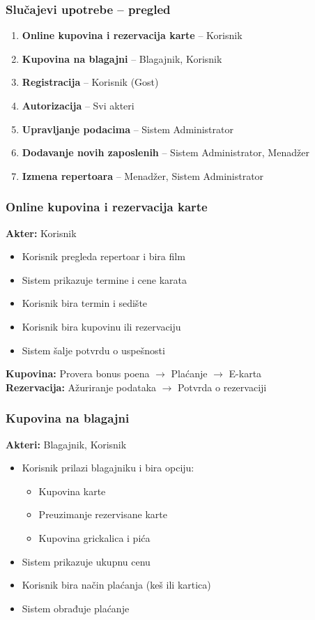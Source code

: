 \documentclass{beamer}
\begin{document}
\begin{frame}
\frametitle{Slučajevi upotrebe -- pregled}
\begin{enumerate}
\item \textbf{Online kupovina i rezervacija karte} -- Korisnik
\item \textbf{Kupovina na blagajni} -- Blagajnik, Korisnik
\item \textbf{Registracija} -- Korisnik (Gost)
\item \textbf{Autorizacija} -- Svi akteri
\item \textbf{Upravljanje podacima} -- Sistem Administrator
\item \textbf{Dodavanje novih zaposlenih} -- Sistem Administrator, Menadžer
\item \textbf{Izmena repertoara} -- Menadžer, Sistem Administrator
\end{enumerate}
\end{frame}

\begin{frame}
\frametitle{Online kupovina i rezervacija karte}
\textbf{Akter:} Korisnik 

\vspace{8pt}
\begin{itemize}
\item Korisnik pregleda repertoar i bira film
\item Sistem prikazuje termine i cene karata
\item Korisnik bira termin i sedište
\item Korisnik bira kupovinu ili rezervaciju
\item Sistem šalje potvrdu o uspešnosti
\end{itemize}

\vspace{5pt}
\textbf{Kupovina:} Provera bonus poena $\rightarrow$ Plaćanje $\rightarrow$ E-karta\\
\textbf{Rezervacija:} Ažuriranje podataka $\rightarrow$  Potvrda o rezervaciji
\end{frame}

\begin{frame}
\frametitle{Kupovina na blagajni}
\textbf{Akteri:} Blagajnik, Korisnik 

\vspace{8pt}
\begin{itemize}
\item Korisnik prilazi blagajniku i bira opciju:
  \begin{itemize}
  \item Kupovina karte
  \item Preuzimanje rezervisane karte
  \item Kupovina grickalica i pića
  \end{itemize}
\item Sistem prikazuje ukupnu cenu
\item Korisnik bira način plaćanja (keš ili kartica)
\item Sistem obrađuje plaćanje
\end{itemize}
\end{frame}
\end{document}
